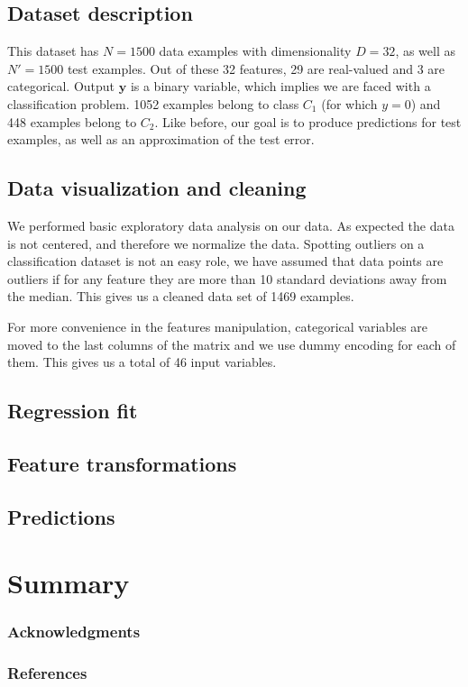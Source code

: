 \documentclass{article} %
\begin{document}
  \subsection{Dataset description}
  This dataset has $N = 1500$ data examples with dimensionality $D = 32$, as well as $N' = 1500$ test examples. Out of these 32 features, 29 are real-valued and 3 are categorical. Output $\mathbf{y}$ is a binary variable, which implies we are faced with a classification problem. 1052 examples belong to class $C_1$ (for which $y = 0$) and 448 examples belong to $C_2$. Like before, our goal is to produce predictions for test examples, as well as an approximation of the test error.

  \subsection{Data visualization and cleaning}
We performed basic exploratory data analysis on our data. As expected the data is not centered, and therefore we normalize the data. Spotting outliers on a classification dataset is not an easy role, we have assumed that data points are outliers if for any feature they are more than 10 standard deviations away from the median. This gives us a cleaned data set of 1469 examples.

For more convenience in the features manipulation, categorical variables are moved to the last columns of the matrix and we use dummy encoding for each of them. This gives us a total of 46 input variables.

  \subsection{Regression fit}

  \subsection{Feature transformations}

  \subsection{Predictions}



\section{Summary}

\subsubsection*{Acknowledgments}

\subsubsection*{References}
\end{document}
